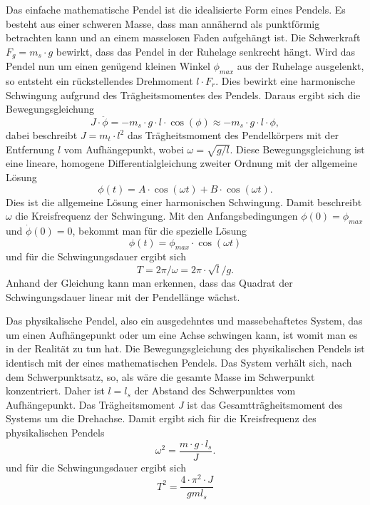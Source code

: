 \documentclass[a4paper, 11pt]{article}
\begin{document}
Das einfache mathematische Pendel ist die idealisierte Form eines Pendels. Es besteht aus einer schweren Masse, dass man annähernd als punktförmig betrachten kann und an einem masselosen Faden aufgehängt ist. Die Schwerkraft $F_g = m_s \cdot g$ bewirkt, dass das Pendel in der Ruhelage senkrecht hängt. Wird das Pendel  nun um einen genügend kleinen Winkel $\phi_{max}$ aus der Ruhelage ausgelenkt, so entsteht ein rückstellendes Drehmoment $l\cdot F_r$. Dies bewirkt eine harmonische Schwingung aufgrund des Trägheitsmomentes des Pendels. Daraus ergibt sich die Bewegungsgleichung
\begin{equation} 
J \cdot \ddot \phi = -m_s \cdot g \cdot l \cdot \cos(\phi)\approx -m_s \cdot g \cdot l \cdot \phi,
\end{equation}
dabei beschreibt $J = m_t \cdot l^2$ das Trägheitsmoment des Pendelkörpers mit der Entfernung $l$ vom Aufhängepunkt,
wobei $\omega = \sqrt{g/l}$. Diese Bewegungsgleichung ist eine lineare, homogene Differentialgleichung zweiter Ordnung mit der allgemeine Lösung
\begin{equation}
\phi(t) = A \cdot \cos(\omega t)+ B \cdot \cos(\omega t).
\end{equation}
Dies ist die allgemeine Lösung einer harmonischen Schwingung. Damit beschreibt $\omega$ die Kreisfrequenz der Schwingung. Mit den Anfangsbedingungen $\phi(0) = \phi_{max}$ und $\dot \phi(0) = 0$, bekommt man für die spezielle Lösung
\begin{equation}
\phi(t) = \phi_{max} \cdot \cos(\omega t)
\end{equation} 
und für die Schwingungsdauer ergibt sich 
\begin{equation}
T = 2\pi/\omega = 2\pi \cdot \surd l/g.
\end{equation} 
Anhand der Gleichung kann man erkennen, dass das Quadrat der Schwingungsdauer linear mit der Pendellänge wächst.  

Das physikalische Pendel, also ein ausgedehntes und massebehaftetes System, das um einen Aufhängepunkt oder um eine Achse schwingen kann, ist womit man es in der Realität zu tun hat. Die Bewegungsgleichung des physikalischen Pendels ist identisch mit der eines mathematischen Pendels.
Das System verhält sich, nach dem Schwerpunktsatz, so, als wäre die gesamte Masse im Schwerpunkt konzentriert. Daher ist $l = l_s$ der Abstand des Schwerpunktes vom Aufhängepunkt. Das Trägheitsmoment $J$ ist das Gesamtträgheitsmoment des Systems um die Drehachse. Damit ergibt sich für die Kreisfrequenz des physikalischen Pendels 
\begin{equation}
\omega^2 = \frac {m \cdot g \cdot l_s} {J}.
\end{equation} 
und für die Schwingungsdauer ergibt sich 
\begin{equation}
T^2 = \frac {4 \cdot \pi ^2 \cdot J} { gml_s}
\end{equation}
\end{document}
